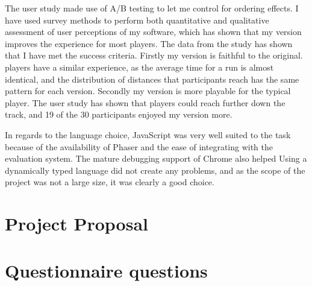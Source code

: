 \documentclass[12pt,a4paper,twoside,openright]{report}
\begin{document}
The user study made use of A/B testing to let me control for ordering effects.
I have used survey methods to perform both quantitative and qualitative assessment of user perceptions of my software, which has shown that my version improves the experience for most players.
The data from the study has shown that I have met the success criteria. Firstly my version is faithful to the original. players have a similar experience, as the average time for a run is almost identical, and the distribution of distances that participants reach has the same pattern for each version.
Secondly my version is more playable for the typical player. The user study has shown that players could reach further down the track, and 19 of the 30 participants enjoyed my version more.


In regards to the language choice, JavaScript was very well suited to the task because of the availability of Phaser and the ease of integrating with the evaluation system.
The mature debugging support of Chrome also helped 
Using a dynamically typed language did not create any problems, and as the scope of the project was not a large size, it was clearly a good choice.



\appendix


\chapter{Project Proposal}


\chapter{Questionnaire questions}
\label{qs}
\end{document}

